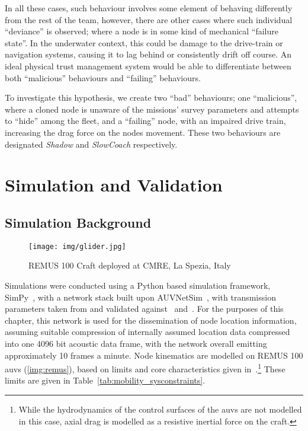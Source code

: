 In all these cases, such behaviour involves some element of behaving differently from the rest of the team, however, there are other cases where such individual ``deviance'' is observed; where a node is in some kind of mechanical ``failure state''.
In the underwater context, this could be damage to the drive-train or navigation systems, causing it to lag behind or consistently drift off course. 
An ideal physical trust management system would be able to differentiate between both ``malicious'' behaviours and ``failing'' behaviours.

To investigate this hypothesis, we create two ``bad'' behaviours; one ``malicious'', where a cloned node is unaware of the missions' survey parameters and attempts to ``hide'' among the fleet, and a ``failing'' node, with an impaired drive train, increasing the drag force on the nodes movement.
These two behaviours are designated \emph{Shadow} and \emph{SlowCoach} respectively.
\pagebreak
\section{Simulation and Validation}\label{sec:sim_and_valid}

\subsection{Simulation Background}

\begin{figure}
	\centering
	\texttt{[image: img/glider.jpg]}
	\caption{REMUS 100 Craft deployed at CMRE, La Spezia, Italy}
	\label{img:remus}
\end{figure}

Simulations were conducted using a Python based simulation framework, SimPy~\cite{Mueller2003SimPy}, with a network stack built upon AUVNetSim~\cite{Miquel2008}, with transmission parameters taken from and validated against~\cite{Stojanovic2007} and~\cite{Stefanov2011}.
For the purposes of this chapter, this network is used for the dissemination of node location information, assuming suitable compression of internally assumed location data compressed into one 4096 bit acoustic data frame, with the network overall emitting approximately 10 frames a minute.
Node kinematics are modelled on REMUS 100 \glspl{auv} (\autoref{img:remus}), based on limits and core characteristics given in~\cite{Mcewen2001,Milgram2001,Samad2011}.\footnote{While the hydrodynamics of the control surfaces of the \glspl{auv} are not modelled in this case, axial drag is modelled as a resistive inertial force on the craft.}
These limits are given in Table~\ref{tab:mobility_sysconstraints}.


